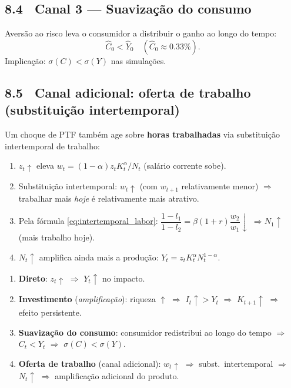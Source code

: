 \documentclass[12pt, a4paper]{article}
\begin{document}
\subsection*{8.4 \ Canal 3 --- Suavização do consumo}

Aversão ao risco leva o consumidor a distribuir o ganho ao longo do tempo:
\[
\hat{C}_0 < \hat{Y}_0 \quad (\hat{C}_0 \approx 0.33\%).
\]
Implicação: $\sigma(C) < \sigma(Y)$ nas simulações.

\subsection*{8.5 \ Canal adicional: oferta de trabalho (substituição intertemporal)}

\begin{formulabox}[title={Canal da oferta de trabalho}]
Um choque de PTF também age sobre \textbf{horas trabalhadas} via substituição
intertemporal de trabalho:
\begin{enumerate}[leftmargin=1.5em, topsep=2pt, itemsep=2pt]
  \item $z_t\uparrow$ eleva $w_t = (1-\alpha)z_t K_t^\alpha/N_t$ (salário corrente sobe).
  \item Substituição intertemporal: $w_t\uparrow$ (com $w_{t+1}$ relativamente menor)
    $\Rightarrow$ trabalhar mais \textit{hoje} é relativamente mais atrativo.
  \item Pela fórmula \eqref{eq:intertemporal_labor}:
    $\dfrac{1-l_1}{1-l_2} = \beta(1+r)\dfrac{w_2}{w_1}\downarrow$
    $\Rightarrow N_1\uparrow$ (mais trabalho hoje).
  \item $N_t\uparrow$ amplifica ainda mais a produção: $Y_t = z_t K_t^\alpha N_t^{1-\alpha}$.
\end{enumerate}
\end{formulabox}

\begin{resultbox}[title={Resumo dos três (quatro) canais (Q8)}]
\begin{enumerate}[leftmargin=1.5em, itemsep=3pt]
\item \textbf{Direto}: $z_t\uparrow$ $\Rightarrow$ $Y_t\uparrow$ no impacto.
\item \textbf{Investimento} (\textit{amplificação}):
  riqueza $\uparrow$ $\Rightarrow$ $I_t\uparrow > Y_t$
  $\Rightarrow$ $K_{t+1}\uparrow$ $\Rightarrow$ efeito persistente.
\item \textbf{Suavização do consumo}:
  consumidor redistribui ao longo do tempo $\Rightarrow$ $C_t < Y_t$
  $\Rightarrow$ $\sigma(C) < \sigma(Y)$.
\item \textbf{Oferta de trabalho} (canal adicional):
  $w_t\uparrow$ $\Rightarrow$ subst.\ intertemporal $\Rightarrow$ $N_t\uparrow$
  $\Rightarrow$ amplificação adicional do produto.
\end{enumerate}
\end{resultbox}
\end{document}
